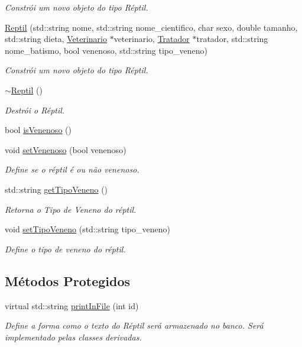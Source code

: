 \begin{DoxyCompactItemize}
\begin{DoxyCompactList}\small\item\em Constrói um novo objeto do tipo Réptil. \end{DoxyCompactList}\item 
\hyperlink{classReptil_a30f237a6e3666277eacd04d9d030e93d}{Reptil} (std\+::string nome, std\+::string nome\+\_\+cientifico, char sexo, double tamanho, std\+::string dieta, \hyperlink{classVeterinario}{Veterinario} $\ast$veterinario, \hyperlink{classTratador}{Tratador} $\ast$tratador, std\+::string nome\+\_\+batismo, bool venenoso, std\+::string tipo\+\_\+veneno)
\begin{DoxyCompactList}\small\item\em Constrói um novo objeto do tipo Réptil. \end{DoxyCompactList}\item 
\mbox{\label{classReptil_a826ed679cc45f74fefecef7d4d40b409}} 
\hyperlink{classReptil_a826ed679cc45f74fefecef7d4d40b409}{$\sim$\+Reptil} ()
\begin{DoxyCompactList}\small\item\em Destrói o Réptil. \end{DoxyCompactList}\item 
bool \hyperlink{classReptil_a07867a1252f279a1fd5afb576d0a5c9a}{is\+Venenoso} ()
\item 
void \hyperlink{classReptil_a9f7ab2a0e2b30040c7c9df48039a266a}{set\+Venenoso} (bool venenoso)
\begin{DoxyCompactList}\small\item\em Define se o réptil é ou não venenoso. \end{DoxyCompactList}\item 
std\+::string \hyperlink{classReptil_aa5e4cd3fa2d94916a3ba5cc20299d3cf}{get\+Tipo\+Veneno} ()
\begin{DoxyCompactList}\small\item\em Retorna o Tipo de Veneno do réptil. \end{DoxyCompactList}\item 
void \hyperlink{classReptil_a3a91e206459f45bf2f951e914b3bc195}{set\+Tipo\+Veneno} (std\+::string tipo\+\_\+veneno)
\begin{DoxyCompactList}\small\item\em Define o tipo de veneno do réptil. \end{DoxyCompactList}\end{DoxyCompactItemize}
\subsection*{Métodos Protegidos}
\begin{DoxyCompactItemize}
\item 
virtual std\+::string \hyperlink{classReptil_af0fc1ff345f15480da9830e38111d181}{print\+In\+File} (int id)
\begin{DoxyCompactList}\small\item\em Define a forma como o texto do Réptil será armazenado no banco. Será implementado pelas classes derivadas. \end{DoxyCompactList}\end{DoxyCompactItemize}
